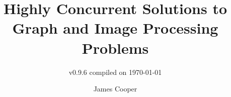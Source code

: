 \documentclass[newzealand,10pt,partial,onehalfspace,final]{aucklandthesis}
\theoremstyle{plain}
\begin{document}
\frontmatter

%
%
%
\title{Highly Concurrent Solutions to Graph and Image Processing Problems}
\subtitle{{\small v0.9.6 compiled on \today}}
\author{James Cooper}

\maketitle
{}




\cleardoublepage\tableofcontents
\cleardoublepage\listoffixmes
\cleardoublepage\listoffigures
\cleardoublepage\listoftables
\cleardoublepage\listofcprulesetfloats
\cleardoublepage\listofcpobjectsfloats
\cleardoublepage\printglossary
\cleardoublepage\printglossary[type=\acronymtype]









%
%
%
%
\end{document}
